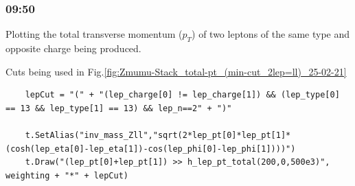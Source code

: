 \subsubsection*{09:50}
Plotting the total transverse momentum ($p_T$) of two leptons of the same type and opposite charge being produced.


Cuts being used in Fig.\ref{fig:Zmumu-Stack_total-pt_(min-cut_2lep=ll)_25-02-21}
\begin{lstlisting}
    lepCut = "(" + "(lep_charge[0] != lep_charge[1]) && (lep_type[0] == 13 && lep_type[1] == 13) && lep_n==2" + ")"

    t.SetAlias("inv_mass_Zll","sqrt(2*lep_pt[0]*lep_pt[1]*(cosh(lep_eta[0]-lep_eta[1])-cos(lep_phi[0]-lep_phi[1])))")
    t.Draw("(lep_pt[0]+lep_pt[1]) >> h_lep_pt_total(200,0,500e3)", weighting + "*" + lepCut)
\end{lstlisting}

